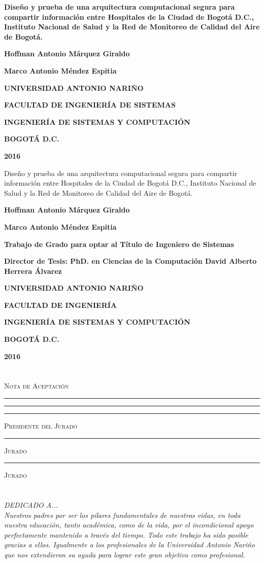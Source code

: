 \documentclass[a4paper,openright,12pt]{book}
\theoremstyle{definition}
\theoremstyle{remark}
\newcommand\portada{
\begin{titlepage}
		\begin{center}
			{\large \bf Diseño y prueba de una arquitectura computacional segura para compartir información entre Hospitales de la Ciudad de Bogotá D.C., Instituto Nacional de Salud y la Red de Monitoreo de Calidad del Aire de Bogotá.}
            
			\vfill
            {\large\bf Hoffman Antonio Márquez Giraldo\par}
 			{\large\bf Marco Antonio Méndez Espitia\par}            
            \vfill
			{\large\bf UNIVERSIDAD ANTONIO NARIÑO  \par}
			{\large\bf FACULTAD DE INGENIERÍA DE SISTEMAS \par}
			{\large\bf INGENIERÍA DE SISTEMAS Y COMPUTACIÓN \par}
			{\large\bf BOGOTÁ D.C.\par}
			{\large\bf 2016 \par}
		\end{center}
\end{titlepage}
}
\newcommand\contraportada{
	\begin{titlepage}
		\begin{center}
{Diseño y prueba de una arquitectura computacional segura para compartir información entre  Hospitales de la Ciudad de Bogotá D.C., Instituto Nacional de Salud y la Red de Monitoreo de Calidad del Aire de Bogotá.} 
			\vfill
            {\large\bf Hoffman Antonio Márquez Giraldo\par}
			{\large\bf Marco Antonio Méndez Espitia \par}            
			\vfill            
             {\large\bf Trabajo de Grado para optar al Título de Ingeniero de Sistemas \par}
             \vfill
			{\large\bf Director de Tesis: PhD. en Ciencias de la Computación David Alberto Herrera Álvarez \par}
			\vfill
			{\large\bf UNIVERSIDAD ANTONIO NARIÑO \par}
			{\large\bf FACULTAD DE INGENIERÍA \par}
			{\large\bf INGENIERÍA DE SISTEMAS Y COMPUTACIÓN \par}
			{\large\bf BOGOTÁ D.C.\par}
			{\large\bf 2016 \par}
		\end{center}
\end{titlepage}
}
\begin{document}
\portada
\contraportada

\chapter*{}
\begin{flushright}
\begingroup

\centering

\textsc{Nota de Aceptación}

\vspace{2em}

\rule[1em]{20em}{0.2pt}
\rule[1em]{20em}{0.2pt}

\vspace{4em}

\rule[1em]{20em}{0.5pt}

\textsc{Presidente del Jurado}

\vspace{2em}

\rule[1em]{20em}{0.5pt}

\textsc{Jurado}

\vspace{2em}

\rule[1em]{20em}{0.5pt}

\textsc{Jurado}

\vspace{3em}


\endgroup
\end{flushright}


\chapter*{}
\begin{flushright}
\textit{DEDICADO A... \\
Nuestros padres por ser los pilares fundamentales de nuestras vidas, en toda nuestra educación, tanto académica, como de la vida, por el incondicional apoyo perfectamente mantenido a través del tiempo. Todo este trabajo ha sido posible gracias a ellos. Igualmente a los profesionales de la Universidad Antonio Nariño que nos extendieron su ayuda para lograr este gran objetivo como profesional. }
\end{flushright}

\end{document}
